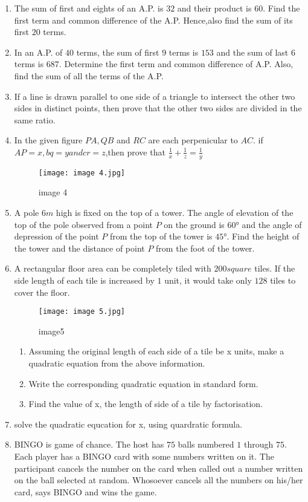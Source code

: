 \documentclass{article}
\begin{document}
\begin{enumerate}
\begin{enumerate}
\end{enumerate}
\item  The sum of first and eights of an A.P. is $32$ and their product is $60$. Find the first term  and common difference of the A.P. Hence,also find the sum of its first $20$ terms.
\item In an A.P. of $40$ terms, the sum of first $9$ terms is $153$ and the sum of last $6$ terms is $687$. Determine the first term and common difference of A.P. Also, find the sum of all the terms of the A.P.
\item If a line is drawn parallel to one side of a triangle to intersect the other two sides in distinct points, then prove that the other two sides are divided in the same ratio.
\item In the given figure $PA,QB$ and $RC$ are each perpenicular to $AC$. if $AP = x,bq=y and cr =z$,then prove that $\frac{1}{x} + \frac{1}{z} = \frac{1}{y}$                                               
\begin{figure}[!ht]
\centering
\texttt{[image: image 4.jpg]}
\label{fig:image 4}
\caption{image 4}
\end{figure}
\newpage
\item A pole $6m$ high is fixed on the top of a tower. The angle of elevation of the top of the pole observed from a point $P$ on the ground is $60°$ and the angle of depression of the point $P$ from the top of the tower is $45°$. Find the height of the tower and the distance of point $P$ from the foot of the tower.
\item A rectangular floor area can be completely tiled with $200square$ tiles. If the side length of each tile is increased by $1$ unit, it would take only $128$ tiles to cover the floor.

\begin{figure}[!ht]
\centering
\texttt{[image: image 5.jpg]}
\label{fig:image5}
	\caption{image5} 
\end{figure}
\begin{enumerate}
\item Assuming the original length of each side of a tile be x units, make a quadratic equation from the above information.\\
\item Write the corresponding quadratic equation in standard form.\\
\item Find the value of x, the length of side of a tile by factorisation.
\end{enumerate}
\item solve the quadratic equcation for x, using quardratic formula.
\newpage
\item BINGO is game of chance. The host has $75$ balls numbered $1$ through $75$. Each player has a BINGO card with some numbers written on it.
The participant cancels the number on the card when called out a number written on the ball selected at random. Whosoever cancels all the numbers on his/her card, says BINGO and wins the game.


\end{enumerate}
\end{document}
